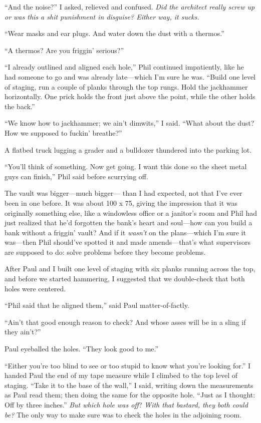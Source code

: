 ``And the noise?'' I asked, relieved and confused. \emph{Did the
architect really screw up or was this a shit punishment in disguise?
Either way, it sucks.}

``Wear masks and ear plugs. And water down the dust with a thermos.''

``A thermos? Are you friggin' serious?''

``I already outlined and aligned each hole,'' Phil continued
impatiently, like he had someone to go and was already late---which I'm
sure he was. ``Build one level of staging, run a couple of planks
through the top rungs. Hold the jackhammer horizontally. One prick holds
the front just above the point, while the other holds the back.''

``We know how to jackhammer; we ain't dimwits,'' I said. ``What about
the dust? How we supposed to fuckin' breathe?''

A flatbed truck lugging a grader and a bulldozer thundered into the
parking lot.

``You'll think of something. Now get going. I want this done so the
sheet metal guys can finish,'' Phil said before scurrying off.

The vault was bigger---much bigger--- than I had expected, not that I've
ever been in one before. It was about 100 x 75, giving the impression
that it was originally something else, like a windowless office or a
janitor's room and Phil had just realized that he'd forgotten the bank's
heart and soul---how can you build a bank without a friggin' vault? And
if it \emph{wasn't} on the plans---which I'm sure it was---then Phil
should've spotted it and made amends---that's what supervisors are
supposed to do: solve problems before they become problems.

After Paul and I built one level of staging with six planks running
across the top, and before we started hammering, I suggested that we
double-check that both holes were centered.

``Phil said that he aligned them,'' said Paul matter-of-factly.

``Ain't that good enough reason to check? And whose asses will be in a
sling if they ain't?''

Paul eyeballed the holes. ``They look good to me.''

``Either you're too blind to see or too stupid to know what you're
looking for.'' I handed Paul the end of my tape measure while I climbed
to the top level of staging. ``Take it to the base of the wall,'' I
said, writing down the measurements as Paul read them; then doing the
same for the opposite hole. ``Just as I thought: Off by three inches.''
\emph{But which hole was off}? \emph{With that bastard, they both could
be?} The only way to make sure was to check the holes in the adjoining
room.

